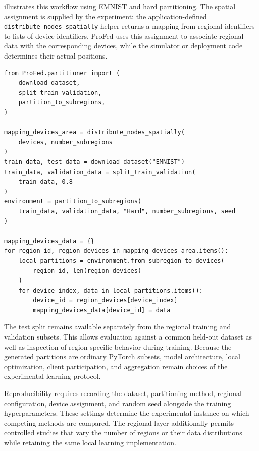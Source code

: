  illustrates this workflow using EMNIST and hard
 partitioning.
%
The spatial assignment is supplied by the experiment: the application-defined
 \texttt{distribute\_\allowbreak nodes\_\allowbreak spatially} helper returns a mapping from regional
 identifiers to lists of device identifiers.
%
ProFed uses this assignment to associate regional data with the corresponding
 devices, while the simulator or deployment code determines their actual positions.


\begin{lstlisting}[style=proFedStyle,
  caption={Partitioning EMNIST across regions and their devices.
   Spatial deployment is provided by an application-defined helper.},
  label={lst:api-example}]
from ProFed.partitioner import (
    download_dataset,
    split_train_validation,
    partition_to_subregions,
)

mapping_devices_area = distribute_nodes_spatially(
    devices, number_subregions
)
train_data, test_data = download_dataset("EMNIST")
train_data, validation_data = split_train_validation(
    train_data, 0.8
)
environment = partition_to_subregions(
    train_data, validation_data, "Hard", number_subregions, seed
)

mapping_devices_data = {}
for region_id, region_devices in mapping_devices_area.items():
    local_partitions = environment.from_subregion_to_devices(
        region_id, len(region_devices)
    )
    for device_index, data in local_partitions.items():
        device_id = region_devices[device_index]
        mapping_devices_data[device_id] = data
\end{lstlisting}

The test split remains available separately from the regional training and
 validation subsets.
%
This allows evaluation against a common held-out dataset as well as
 inspection of region-specific behavior during training.
%
Because the generated partitions are ordinary PyTorch subsets, model
 architecture, local optimization, client participation, and aggregation
 remain choices of the experimental learning protocol.

Reproducibility requires recording the dataset, partitioning method,
 regional configuration, device assignment, and random seed alongside the
 training hyperparameters.
%
These settings determine the experimental instance on which competing
 methods are compared.
%
The regional layer additionally permits controlled studies that vary the
 number of regions or their data distributions while retaining the same
 local learning implementation.

